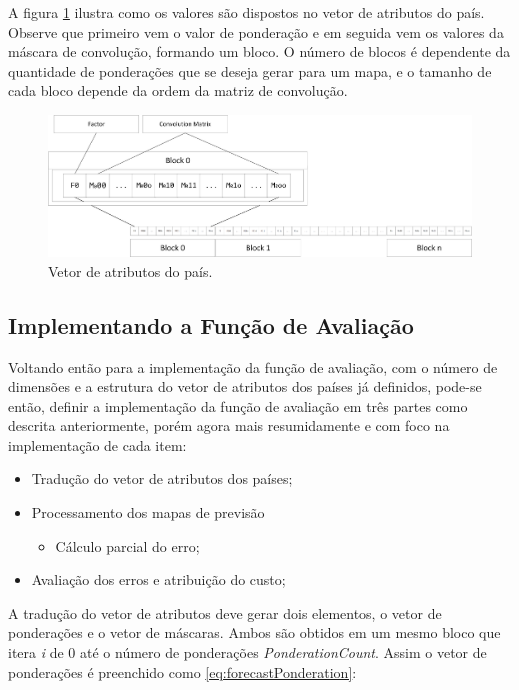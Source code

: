 	A figura \ref{fig:VetorAtributosForecast-Ingles} ilustra como os valores são dispostos no vetor de atributos do país. Observe que primeiro vem o valor de ponderação e em seguida vem os valores da máscara de convolução, formando um bloco. O número de blocos é dependente da quantidade de ponderações que se deseja gerar para um mapa, e o tamanho de cada bloco depende da ordem da matriz de convolução.

\begin{figure}[h]
	\centering	\includegraphics[scale=0.45]{Figuras/VetorAtributosForecast-Ingles.png}
	\caption{Vetor de atributos do país.}
	\label{fig:VetorAtributosForecast-Ingles}
\end{figure}


\subsection{Implementando a Função de Avaliação}
\label{Implementando a Função de Avaliação}

Voltando então para a implementação da função de avaliação, com o número de dimensões e a estrutura do vetor de atributos dos países já definidos, pode-se então, definir a implementação da função de avaliação em três partes como descrita anteriormente, porém agora mais resumidamente e com foco na implementação de cada item:

\begin{itemize}
\item Tradução do vetor de atributos dos países;
\item Processamento dos mapas de previsão 
\begin{itemize}
\item Cálculo parcial do erro;
\end{itemize}
\item Avaliação dos erros e atribuição do custo;
\end{itemize}

A tradução do vetor de atributos deve gerar dois elementos, o vetor de ponderações e o vetor de máscaras. Ambos são obtidos em um mesmo bloco que itera \emph{i} de 0 até o número de ponderações \emph{PonderationCount}. Assim o vetor de ponderações é preenchido como \ref{eq:forecastPonderation}:
	
